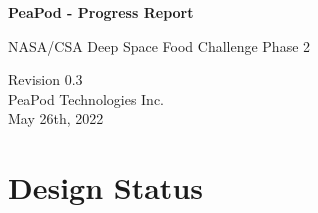 \documentclass{../tex/report}
\begin{document}
\begin{titlepage}
    \begin{center}
        \vspace*{1.2cm}

        \textbf{\large{PeaPod - Progress Report}}

        \vspace{0.5cm}

        NASA/CSA Deep Space Food Challenge Phase 2

        \vfill
        
        \vspace{.75cm}

        Revision 0.3\\
        PeaPod Technologies Inc.\\
        May 26th, 2022

    \end{center}
\end{titlepage}

\thispagestyle{plain}

\tableofcontents
\newpage

\section{Design Status}



\newpage



\newpage



\newpage



\newpage



\newpage



\newpage



\newpage



\newpage


\end{document}
